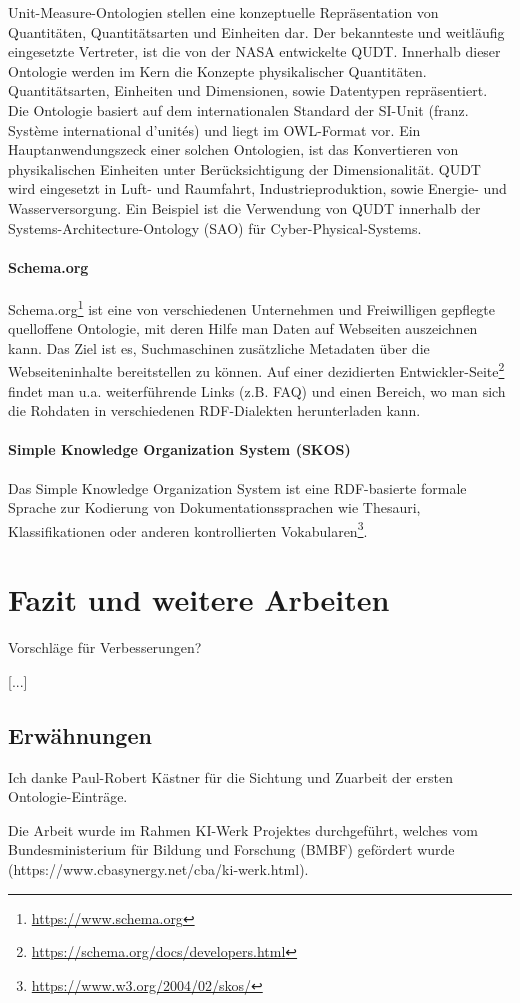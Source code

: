 \documentclass{article}
\begin{document}
Unit-Measure-Ontologien stellen eine konzeptuelle Repräsentation von Quantitäten, Quantitätsarten und Einheiten dar.
Der bekannteste und weitläufig eingesetzte Vertreter, ist die von der NASA entwickelte QUDT\cite{QUDTOntology}.
Innerhalb dieser Ontologie werden im Kern die Konzepte physikalischer Quantitäten.
Quantitätsarten, Einheiten und Dimensionen, sowie Datentypen repräsentiert.
Die Ontologie basiert auf dem internationalen Standard der SI-Unit (franz. Système international d'unités) und liegt im OWL-Format vor. Ein Hauptanwendungszeck einer solchen Ontologien, ist das Konvertieren von physikalischen  Einheiten unter Berücksichtigung der Dimensionalität.
QUDT wird eingesetzt in Luft- und Raumfahrt, Industrieproduktion, sowie Energie- und Wasserversorgung.
Ein Beispiel ist die Verwendung von QUDT innerhalb der Systems-Architecture-Ontology (SAO) für Cyber-Physical-Systems.

\paragraph{Schema.org}

Schema.org\footnote{\url{https://www.schema.org}} ist eine von verschiedenen Unternehmen und Freiwilligen gepflegte quelloffene Ontologie, mit deren Hilfe man Daten auf Webseiten auszeichnen kann.
Das Ziel ist es, Suchmaschinen zusätzliche Metadaten über die Webseiteninhalte bereitstellen zu können.
Auf einer dezidierten Entwickler-Seite\footnote{\url{https://schema.org/docs/developers.html}} findet man u.a. weiterführende Links (z.B. FAQ) und einen Bereich, wo man sich die Rohdaten in verschiedenen RDF-Dialekten herunterladen kann.

\paragraph{Simple Knowledge Organization System (SKOS)}

Das Simple Knowledge Organization System ist eine RDF-basierte formale Sprache zur Kodierung von Dokumentationssprachen wie Thesauri, Klassifikationen oder anderen kontrollierten Vokabularen\footnote{\url{https://www.w3.org/2004/02/skos/}}.



\section{Fazit und weitere Arbeiten}

Vorschläge für Verbesserungen?

[...]

\subsection{Erwähnungen}

Ich danke Paul-Robert Kästner für die Sichtung und Zuarbeit der ersten Ontologie-Einträge.

Die Arbeit wurde im Rahmen KI-Werk Projektes durchgeführt, welches vom Bundesministerium für Bildung und Forschung (BMBF) gefördert wurde (https://www.cbasynergy.net/cba/ki-werk.html).



\medskip

\printbibliography
\end{document}
